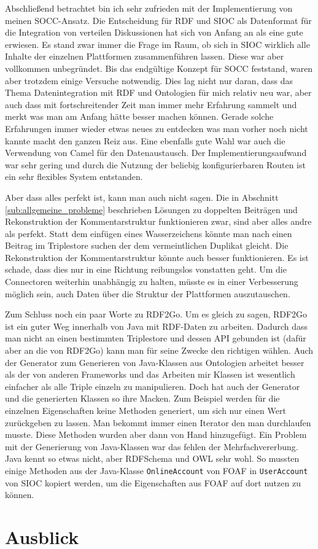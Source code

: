 Abschließend betrachtet bin ich sehr zufrieden mit der Implementierung von meinen SOCC-Ansatz. Die Entscheidung für RDF und SIOC als Datenformat für die Integration von verteilen Diskussionen hat sich von Anfang an als eine gute erwiesen. Es stand zwar immer die Frage im Raum, ob sich in SIOC wirklich alle Inhalte der einzelnen Plattformen zusammenführen lassen. Diese war aber vollkommen unbegründet. Bis das endgültige Konzept für SOCC feststand, waren aber trotzdem einige Versuche notwendig. Dies lag nicht nur daran, dass das Thema Datenintegration mit RDF und Ontologien für mich relativ neu war, aber auch dass mit fortschreitender Zeit man immer mehr Erfahrung sammelt und merkt was man am Anfang hätte besser machen können. Gerade solche Erfahrungen immer wieder etwas neues zu entdecken was man vorher noch nicht kannte macht den ganzen Reiz aus. Eine ebenfalls gute Wahl war auch die Verwendung von Camel für den Datenaustausch. Der Implementierungsaufwand war sehr gering und durch die Nutzung der beliebig konfigurierbaren Routen ist ein sehr flexibles System entstanden. 

Aber dass alles perfekt ist, kann man auch nicht sagen. Die in Abschnitt \ref{sub:allgemeine_probleme} beschrieben Lösungen zu doppelten Beiträgen und Rekonstruktion der Kommentarstruktur funktionieren zwar, sind aber alles andre als perfekt. Statt dem einfügen eines Wasserzeichens könnte man nach einen Beitrag im Triplestore suchen der dem vermeintlichen Duplikat gleicht. Die Rekonstruktion der Kommentarstruktur könnte auch besser funktionieren. Es ist schade, dass dies nur in eine Richtung reibungslos vonstatten geht. Um die Connectoren weiterhin unabhängig zu halten, müsste es in einer Verbesserung möglich sein, auch Daten über die Struktur der Plattformen auszutauschen. 

Zum Schluss noch ein paar Worte zu RDF2Go. Um es gleich zu sagen, RDF2Go ist ein guter Weg innerhalb von Java mit RDF-Daten zu arbeiten. Dadurch dass man nicht an einen bestimmten Triplestore und dessen API gebunden ist (dafür aber an die von RDF2Go) kann man für seine Zwecke den richtigen wählen. Auch der Generator zum Generieren von Java-Klassen aus Ontologien arbeitet besser als der von anderen Frameworks und das Arbeiten mir Klassen ist wesentlich einfacher als alle Triple einzeln zu manipulieren. Doch hat auch der Generator und die generierten Klassen so ihre Macken. Zum Beispiel werden für die einzelnen Eigenschaften keine Methoden generiert, um sich nur einen Wert zurückgeben zu lassen. Man bekommt immer einen Iterator den man durchlaufen musste. Diese Methoden wurden aber dann von Hand hinzugefügt. Ein Problem mit der Generierung von Java-Klassen war das fehlen der Mehrfachvererbung. Java kennt so etwas nicht, aber RDFSchema und OWL sehr wohl. So mussten einige Methoden aus der Java-Klasse \texttt{OnlineAccount} von FOAF in \texttt{UserAccount} von SIOC kopiert werden, um die Eigenschaften aus FOAF auf dort nutzen zu können.


\section{Ausblick} %
\label{sec:ausblick}





